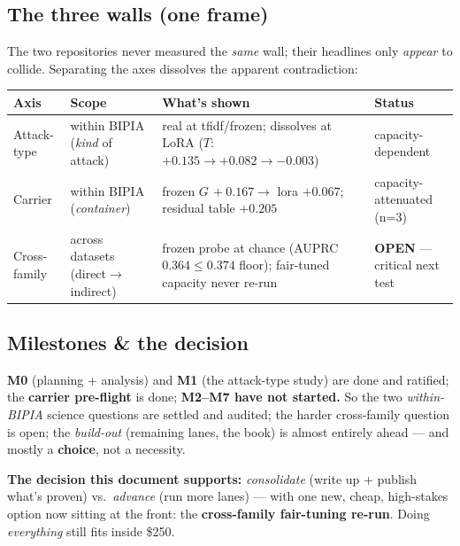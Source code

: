 \documentclass[11pt,parskip=half-]{scrartcl}
\newcommand{\arr}{\ensuremath{\rightarrow}}
\begin{document}
\subsection*{The three walls (one frame)}
The two repositories never measured the \emph{same} wall; their headlines only \emph{appear} to collide.
Separating the axes dissolves the apparent contradiction:

\begin{center}\small
\begin{tabularx}{\linewidth}{@{}l l Y l@{}}
\toprule
\textbf{Axis} & \textbf{Scope} & \textbf{What's shown} & \textbf{Status} \\
\midrule
Attack-type & within BIPIA (\emph{kind} of attack) &
  real at tfidf/frozen; dissolves at LoRA ($T$: $+0.135 \arr +0.082 \arr -0.003$) &
  \textcolor{shown}{capacity-dependent} \\[4pt]
Carrier & within BIPIA (\emph{container}) &
  frozen $G\,{+}0.167 \arr$ lora $+0.067$; residual table $+0.205$ &
  \textcolor{shown}{capacity-attenuated} (n=3) \\[4pt]
Cross-family & across datasets (direct\arr indirect) &
  frozen probe at chance (AUPRC $0.364 \le 0.374$ floor); fair-tuned capacity never re-run &
  \textcolor{openred}{\textbf{OPEN}} --- critical next test \\
\bottomrule
\end{tabularx}
\end{center}

\subsection*{Milestones \& the decision}
\textbf{M0} (planning + analysis) and \textbf{M1} (the attack-type study) are done and ratified; the
\textbf{carrier pre-flight} is done; \textbf{M2--M7 have not started.} So the two \emph{within-BIPIA}
science questions are settled and audited; the harder cross-family question is open; the
\emph{build-out} (remaining lanes, the book) is almost entirely ahead --- and mostly a \textbf{choice},
not a necessity.

\textbf{The decision this document supports:} \emph{consolidate} (write up + publish what's proven) vs.\
\emph{advance} (run more lanes) --- with one new, cheap, high-stakes option now sitting at the front:
the \textbf{cross-family fair-tuning re-run}. Doing \emph{everything} still fits inside \$250.

\end{document}
